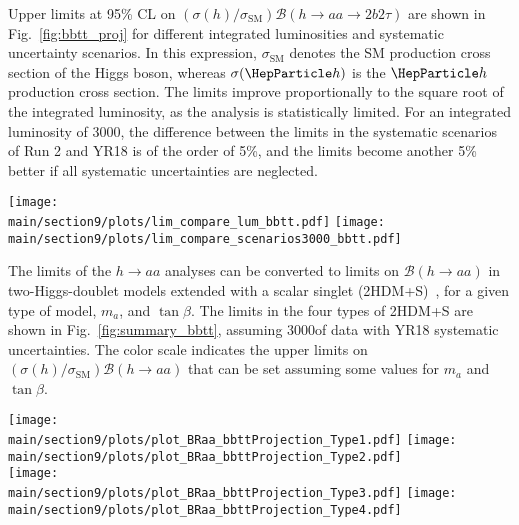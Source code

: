 Upper limits at 95\% CL on $(\sigma(h)/\sigma_{\textrm{SM}}) \mathcal{B}(h \to aa \to 2b2\tau)$ are shown in Fig.~\ref{fig:bbtt_proj} for different integrated luminosities and systematic uncertainty scenarios. In this expression, $\sigma_\textrm{SM}$ denotes the SM production cross section of the Higgs boson, whereas $\sigma(\Ph)$ is the $\Ph$ production cross section.
The limits improve proportionally to the square root of the integrated luminosity,
as the analysis is statistically limited. For an integrated luminosity of 3000\fbinv, the difference between the limits in the  systematic scenarios of Run 2 and YR18 is of the order of 5\%, and the limits become another 5\% better if all systematic uncertainties are neglected.

\begin{figure*}[hbpt]
\centering
        \texttt{[image: \\main/section9/plots/lim\_compare\_lum\_bbtt.pdf]}
        \texttt{[image: \\main/section9/plots/lim\_compare\_scenarios3000\_bbtt.pdf]}\\
    \caption{Left: Projected expected limits on $(\sigma(h)/\sigma_{\textrm{SM}})$ times the branching fraction for $h\to aa\to 2b 2\tau$, for 36, 300, and 3000\fbinv. Right: Projected expected limits $(\sigma(h)/\sigma_{\textrm{SM}}) \mathcal{B}(h\to aa \to 2b2\tau)$, comparing different scenarios for systematic uncertainties for an integrated luminosity of 3000\fbinv.}
    \label{fig:bbtt_proj}
\end{figure*}

The limits of the $h\to aa$ analyses can be converted to limits on $\mathcal{B}(h\to aa)$
in two-Higgs-doublet models extended with
a scalar singlet (2HDM+S)~\cite{PhysRevD.90.075004}, for a given type of model, $m_a$, and $\tan\beta$. The limits in the four types of 2HDM+S are shown
in Fig.~\ref{fig:summary_bbtt}, assuming 3000\fbinv of data with YR18 systematic uncertainties. The color scale
indicates the upper limits on $(\sigma(h)/\sigma_{\textrm{SM}}) \mathcal{B}(h\to aa)$ that can be set assuming some values for $m_a$ and $\tan\beta$.

\begin{figure*}[hbpt]
\centering
        \texttt{[image: \\main/section9/plots/plot\_BRaa\_bbttProjection\_Type1.pdf]}
        \texttt{[image: \\main/section9/plots/plot\_BRaa\_bbttProjection\_Type2.pdf]} \\
        \texttt{[image: \\main/section9/plots/plot\_BRaa\_bbttProjection\_Type3.pdf]}
        \texttt{[image: \\main/section9/plots/plot\_BRaa\_bbttProjection\_Type4.pdf]}
    \caption{Expected upper limits on $(\sigma(h)/\sigma_{\textrm{SM}}) \mathcal{B}(h\to aa)$ for 3000 fb$^{-1}$ of data with YR18 systematic uncertainties for the $2b 2\tau$ final state in 2HDM+S type-1 (top left), type-2 (top right), type-3 (bottom left), and type-4 (bottom right).}
    \label{fig:summary_bbtt}
\end{figure*}


